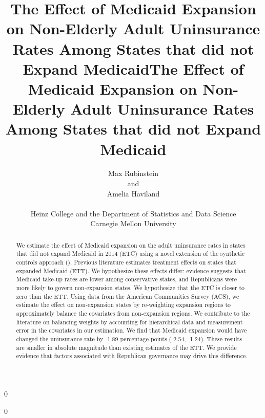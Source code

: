 \documentclass[12pt]{article}
\newcommand{\blind}{0}
\begin{document}
\blind
{
  \title{\bf The Effect of Medicaid Expansion on Non-Elderly Adult Uninsurance Rates Among States that did not Expand Medicaid}
  \author{Max Rubinstein \hspace{.2cm}\\
    and \\
    Amelia Haviland \\ \\
    Heinz College and the Department of Statistics and Data Science \\ Carnegie Mellon University}
  \maketitle
} \fi

\blind
{
  \bigskip
  \bigskip
  \bigskip
  \begin{center}
  \title{\bf The Effect of Medicaid Expansion on Non-Elderly Adult Uninsurance Rates Among States that did not Expand Medicaid}
\end{center}
  \medskip
} \fi

\bigskip

\begin{abstract}

We estimate the effect of Medicaid expansion on the adult uninsurance rates in states that did not expand Medicaid in 2014 (ETC) using a novel extension of the synthetic controls approach (\cite{abadie2010synthetic}). Previous literature estimates treatment effects on states that expanded Medicaid (ETT). We hypothesize these effects differ: evidence suggests that Medicaid take-up rates are lower among conservative states, and Republicans were more likely to govern non-expansion states. We hypothesize that the ETC is closer to zero than the ETT. Using data from the American Communities Survey (ACS), we estimate the effect on non-expansion states by re-weighting expansion regions to approximately balance the covariates from non-expansion regions. We contribute to the literature on balancing weights by accounting for hierarchical data and measurement error in the covariates in our estimation. We find that Medicaid expansion would have changed the uninsurance rate by -1.89 percentage points (-2.54, -1.24). These results are smaller in absolute magnitude than existing estimates of the ETT. We provide evidence that factors associated with Republican governance may drive this difference.

\end{abstract}
\end{document}
